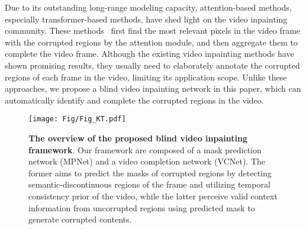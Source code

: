 Due to its outstanding long-range modeling capacity, attention-based methods, especially transformer-based methods, have shed light on the video inpainting community. 
These methods~\cite{cai2022devit,lee2019cpnet,Li2020ShortTermAL,liu2021fuseformer,Ren_2022_CVPR,9010390,srinivasan2021spatial,yan2020sttn,zhang2022flow} first find the most relevant pixels in the video frame with the corrupted regions by the attention module, and then aggregate them to complete the video frame. 
Although the existing video inpainting methods have shown promising results, 
they usually need to elaborately annotate the corrupted regions of each frame in the video,
limiting its application scope.
Unlike these approaches, we propose a blind video inpainting network in this paper, which can automatically identify and complete the corrupted regions in the video.


\begin{figure*}[tb]
\centering%
\texttt{[image: Fig/Fig\_KT.pdf]}
\vspace{-0.15cm}
\caption{\textbf{The overview of the proposed blind video inpainting framework}. Our framework are composed of a mask prediction network (MPNet) and a video completion network (VCNet). The former aims to predict the masks of corrupted regions by detecting semantic-discontinuous regions of the frame and utilizing temporal consistency prior of the video, while the latter perceive valid context information from uncorrupted regions using predicted mask to generate corrupted contents.
}
\label{Fig_KT}
\vspace{-0.5cm}
\end{figure*}

